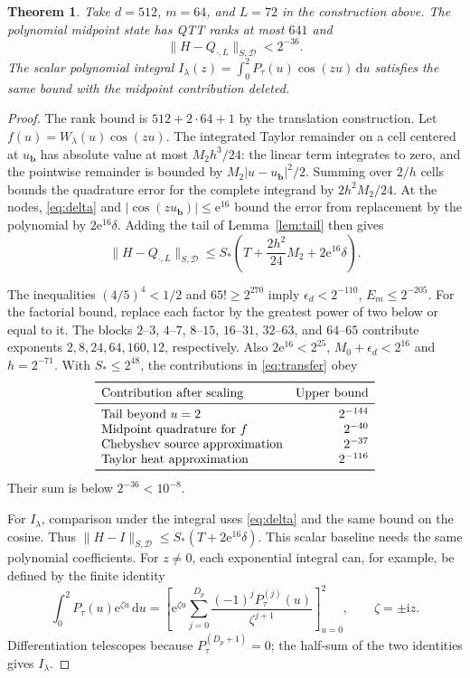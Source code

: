 \documentclass[11pt]{article}
\newtheorem{theorem}{Theorem}[section]
\newcommand{\e}{\mathrm e}
\newcommand{\ii}{\mathrm i}
\newcommand{\dd}{\mathrm d}
\newcommand{\boxD}{\mathcal D}
\begin{document}
\begin{theorem}
Take \(d=512\), \(m=64\), and \(L=72\) in the construction above.
The polynomial midpoint state has QTT ranks at most \(641\) and
\[
 \|H-Q_{\cdot,L}\|_{S,\boxD}<2^{-36}.
\]
The scalar polynomial integral
\(I_\lambda(z)=\int_0^2P_\tau(u)\cos(zu)\,\dd u\)
satisfies the same bound with the midpoint contribution deleted.
\end{theorem}
\begin{proof}
The rank bound is \(512+2\cdot64+1\) by the translation construction.
Let \(f(u)=W_\lambda(u)\cos(zu)\). The integrated Taylor remainder
on a cell centered at \(u_{\boldsymbol b}\) has absolute value
at most \(M_2h^3/24\): the linear term integrates to zero, and the
pointwise remainder is bounded by
\(M_2|u-u_{\boldsymbol b}|^2/2\).
Summing over \(2/h\) cells bounds the quadrature error for the
complete integrand by \(2h^2M_2/24\). At the nodes,
\eqref{eq:delta} and \(|\cos(zu_{\boldsymbol b})|\le\e^{16}\)
bound the error from replacement by the polynomial by \(2\e^{16}\delta\).
Adding the tail of Lemma~\ref{lem:tail} then gives
\begin{equation}
 \|H-Q_{\cdot,L}\|_{S,\boxD}
 \le S_*\left(T+\frac{2h^2}{24}M_2+2\e^{16}\delta\right).
 \label{eq:transfer}
\end{equation}

The inequalities \((4/5)^4<1/2\) and
\(65!\ge2^{270}\) imply \(\epsilon_d<2^{-110}\),
\(E_m\le2^{-205}\). For the factorial bound, replace each factor by
the greatest power of two below or equal to it. The blocks
\(2\)--\(3\), \(4\)--\(7\), \(8\)--\(15\), \(16\)--\(31\),
\(32\)--\(63\), and \(64\)--\(65\) contribute exponents
\(2,8,24,64,160,12\), respectively. Also
\(2\e^{16}<2^{25}\), \(M_0+\epsilon_d<2^{16}\) and \(h=2^{-71}\).
With \(S_*\le 2^{48}\), the contributions in \eqref{eq:transfer} obey
\[
 \begin{array}{lr}
 \toprule
 \text{Contribution after scaling} & \text{Upper bound}\\
 \midrule
 \text{Tail beyond }u=2 & 2^{-144}\\
 \text{Midpoint quadrature for }f & 2^{-40}\\
 \text{Chebyshev source approximation} & 2^{-37}\\
 \text{Taylor heat approximation} & 2^{-116}\\
 \bottomrule
 \end{array}
\]
Their sum is below \(2^{-36}<10^{-8}\).

For \(I_\lambda\), comparison under the integral uses
\eqref{eq:delta} and the same bound on the cosine. Thus
\(\|H-I\|_{S,\boxD}\le S_*(T+2\e^{16}\delta)\).
This scalar baseline needs the same polynomial coefficients.
For \(z\ne0\), each exponential integral can, for example, be
defined by the finite identity
\[
 \int_0^2 P_\tau(u)\e^{\zeta u}\,\dd u
  =\left[\e^{\zeta u}\sum_{j=0}^{D_p}
                 \frac{(-1)^j P_\tau^{(j)}(u)}{\zeta^{j+1}}\right]_{u=0}^{2},
 \qquad \zeta=\pm\ii z .
\]
Differentiation telescopes because \(P_\tau^{(D_p+1)}=0\);
the half-sum of the two identities gives \(I_\lambda\).
\end{proof}
\end{document}
